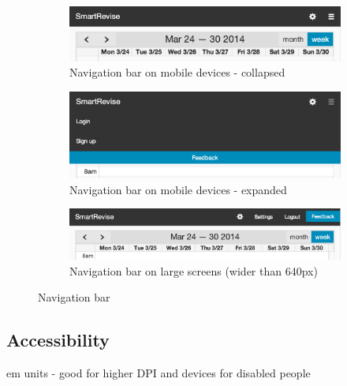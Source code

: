 \documentclass[bsc,frontabs,twoside,singlespacing,parskip]{infthesis}     %
\begin{document}
			\begin{figure}
			        \centering
			        \begin{subfigure}[b]{\textwidth}
						\includegraphics[width=\linewidth]{result_menu_collapsed}
					    \caption{Navigation bar on mobile devices - collapsed}
					    \label{fig:result_menu_mobile}
			        \end{subfigure}

	                \begin{subfigure}[b]{\textwidth}
	        			\includegraphics[width=\linewidth]{result_menu_expanded}
	        		    \caption{Navigation bar on mobile devices - expanded}
	        		    \label{fig:result_menu_mobile}
	                \end{subfigure}

			        \begin{subfigure}[b]{\textwidth}
						\includegraphics[width=\linewidth]{result_menu_normal}
					    \caption{Navigation bar on large screens (wider than 640px)}
					    \label{fig:result_menu_desktop}
			        \end{subfigure}
			        \caption{Navigation bar}\label{fig:navbar}
			\end{figure}


		\subsection{Accessibility}

			em units - good for higher DPI and devices for disabled people
\end{document}
